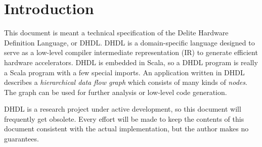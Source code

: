 \section{Introduction}
This document is meant a technical specification of the Delite Hardware
Definition Language, or DHDL. DHDL is a domain-specific language designed to
serve as a low-level compiler intermediate representation (IR) to generate efficient
hardware accelerators. DHDL is embedded in Scala, so a DHDL program is really a Scala
program with a few special imports. An application written in DHDL describes a \emph{hierarchical data flow
graph} which consists of many kinds of \emph{nodes}. The graph can be used for further
analysis or low-level code generation.

DHDL is a research project under active development, so this document will frequently get obsolete.
Every effort will be made to keep the contents of this document consistent with the actual
implementation, but the author makes no guarantees.
